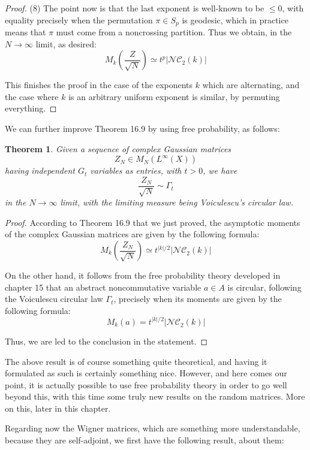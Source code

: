 \documentclass[12pt]{amsbook}
\newtheorem{theorem}{Theorem}[chapter]
\begin{document}
\begin{proof}
(8) The point now is that the last exponent is well-known to be $\leq 0$, with equality precisely when the permutation $\pi\in S_p$ is geodesic, which in practice means that $\pi$ must come from a noncrossing partition. Thus we obtain, in the $N\to\infty$ limit, as desired:
$$M_k\left(\frac{Z}{\sqrt{N}}\right)\simeq t^p|\mathcal{NC}_2(k)|$$

This finishes the proof in the case of the exponents $k$ which are alternating, and the case where $k$ is an arbitrary uniform exponent is similar, by permuting everything.
\end{proof}

We can further improve Theorem 16.9 by using free probability, as follows:

\begin{theorem}
Given a sequence of complex Gaussian matrices
$$Z_N\in M_N(L^\infty(X))$$
having independent $G_t$ variables as entries, with $t>0$, we have
$$\frac{Z_N}{\sqrt{N}}\sim\Gamma_t$$
in the $N\to\infty$ limit, with the limiting measure being Voiculescu's circular law.
\end{theorem}

\begin{proof}
According to Theorem 16.9 that we just proved, the asymptotic moments of the complex Gaussian matrices are given by the following formula:
$$M_k\left(\frac{Z_N}{\sqrt{N}}\right)\simeq t^{|k|/2}|\mathcal{NC}_2(k)|$$

On the other hand, it follows from the free probability theory developed in chapter 15 that an abstract noncommutative variable $a\in A$ is circular, following the Voiculescu circular law $\Gamma_t$, precisely when its moments are given by the following formula:
$$M_k(a)=t^{|k|/2}|\mathcal{NC}_2(k)|$$

Thus, we are led to the conclusion in the statement.
\end{proof}

The above result is of course something quite theoretical, and having it formulated as such is certainly something nice. However, and here comes our point, it is actually possible to use free probability theory in order to go well beyond this, with this time some truly new results on the random matrices. More on this, later in this chapter.

\bigskip
 
Regarding now the Wigner matrices, which are something more understandable, because they are self-adjoint, we first have the following result, about them:
\end{document}
